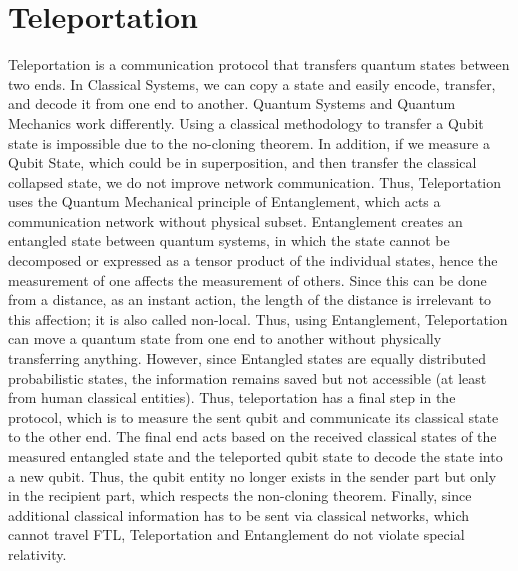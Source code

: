 \section*{Teleportation}

Teleportation is a communication protocol that transfers quantum states between two ends. In Classical Systems, we can copy a state and easily encode, transfer, and decode it from one end to another. Quantum Systems and Quantum Mechanics work differently. Using a classical methodology to transfer a Qubit state is impossible due to the no-cloning theorem. In addition, if we measure a Qubit State, which could be in superposition, and then transfer the classical collapsed state, we do not improve network communication. Thus, Teleportation uses the Quantum Mechanical principle of Entanglement, which acts a communication network without physical subset. Entanglement creates an entangled state between quantum systems, in which the state cannot be decomposed or expressed as a tensor product of the individual states, hence the measurement of one affects the measurement of others. Since this can be done from a distance, as an instant action, the length of the distance is irrelevant to this affection; it is also called non-local. Thus, using Entanglement, Teleportation can move a quantum state from one end to another without physically transferring anything. However, since Entangled states are equally distributed probabilistic states, the information remains saved but not accessible (at least from human classical entities). Thus, teleportation has a final step in the protocol, which is to measure the sent qubit and communicate its classical state to the other end. The final end acts based on the received classical states of the measured entangled state and the teleported qubit state to decode the state into a new qubit. Thus, the qubit entity no longer exists in the sender part but only in the recipient part, which respects the non-cloning theorem. Finally, since additional classical information has to be sent via classical networks, which cannot travel FTL, Teleportation and Entanglement do not violate special relativity. 
